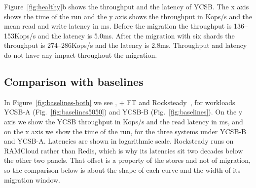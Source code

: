 Figure~\ref{fig:healthy}b shows the throughput and the latency of YCSB.
The x axis shows the time of the run and the y axis shows the throughput in Kops/s and the mean read and write latency in ms.
Before the migration the throughput is 136--153Kops/s and the latency is 5.0ms.
After the migration with six shards the throughput is 274--286Kops/s and the latency is 2.8ms.
Throughput and latency do not have any impact throughout the migration.

\subsection{Comparison with baselines}
\label{sec:eval-sota}


In Figure~\ref{fig:baselines-both} we see \OurImplementation{}, \OurImplementation{} + FT
and Rocksteady~\cite{rocksteady}, for workloads YCSB-A (Fig.~\ref{fig:baselines5050}) and
YCSB-B (Fig.~\ref{fig:baselines}).
On the y axis we show the YCSB throughput in Kops/s and the read latency in ms, and on
the x axis we show the time of the run, for the three systems under YCSB-B and YCSB-A.
Latencies are shown in logarithmic scale.
Rocksteady runs on RAMCloud rather than Redis, which is why its latencies sit two decades
below the other two panels.
That offset is a property of the stores and not of migration, so the comparison below is
about the shape of each curve and the width of its migration window.

